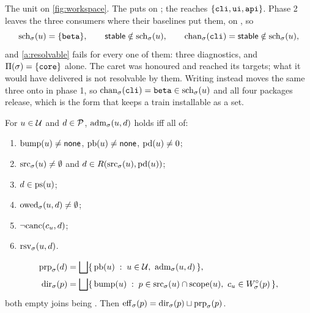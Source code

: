 \begin{example}
\label{ex:resolvable}
The unit  on \cref{fig:workspace}. The \code{\%}
puts  on ; the \code{\^{}} reaches
$\{\texttt{cli},\texttt{ui},\texttt{api}\}$. Phase 2 leaves the three consumers where
their baselines put them, on \stable, so
\[
  \mathrm{sch}_{\sigma}(u) = \{\texttt{beta}\},\qquad
  \mathsf{stable} \notin \mathrm{sch}_{\sigma}(u),\qquad
  \mathrm{chan}_{\sigma}(\texttt{cli}) = \mathsf{stable} \notin \mathrm{sch}_{\sigma}(u),
\]
and \cref{a:resolvable} fails for every one of them: three 
diagnostics, and $\Pi(\sigma) = \{\texttt{core}\}$ alone. The caret was honoured
and reached its targets; what it would have delivered is not resolvable by
them. Writing  instead moves the same three onto
 in phase 1, so $\mathrm{chan}_{\sigma}(\texttt{cli}) = \texttt{beta} \in
\mathrm{sch}_{\sigma}(u)$ and all four packages release, which is the form that keeps a
train installable as a set.
\end{example}

\begin{definition}
\label{def:admission}
For $u \in \mathcal{U}$ and $d \in \mathcal{P}$, $\mathrm{adm}_{\sigma}(u,d)$ holds iff all of:
\begin{enumerate}[label=(A\arabic*),leftmargin=3.2em]
  \item $\mathrm{bump}(u) \neq \mathsf{none}$, $\mathrm{pb}(u) \neq \mathsf{none}$, $\mathrm{pd}(u) \neq 0$;
    \label{a:live}
  \item $\mathrm{src}_{\sigma}(u) \neq \emptyset$ and
    $d \in R(\mathrm{src}_{\sigma}(u),\mathrm{pd}(u))$; \label{a:reach}
  \item $d \in \mathrm{ps}(u)$; \label{a:scope}
  \item $\mathrm{owed}_{\sigma}(u,d) \neq \emptyset$; \label{a:window}
  \item $\lnot\mathrm{canc}(c_{u},d)$; \label{a:cancel}
  \item $\mathrm{rsv}_{\sigma}(u,d)$. \label{a:resolvable}
\end{enumerate}
\end{definition}

\begin{definition}
\label{def:propagated}
\label{def:direct}
\begin{align*}
  \propb{\st}{d} &= \bigsqcup \{\, \pbump{u} \;:\; u \in \Units,\ \admit{\st}{u}{d} \,\}, \\
  \dirb{\st}{p} &= \bigsqcup \{\, \bumpof{u} \;:\; p \in \srcp{\st}{u} \cap \scopef{u},\
     \cof{u} \in \Winf{\st}{p} \,\},
\end{align*}
both empty joins being \bnone. Then $\mathrm{eff}_{\sigma}(p) = \mathrm{dir}_{\sigma}(p) \sqcup
\mathrm{prp}_{\sigma}(p)$.
\end{definition}

